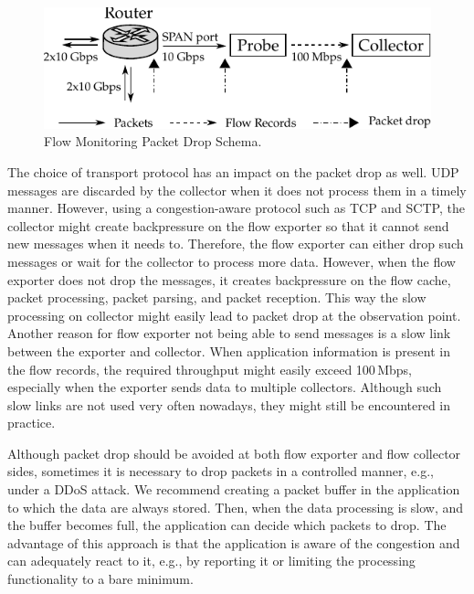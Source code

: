 \begin{figure}[t!]
  \begin{center}
    \includegraphics{figures/c02/flow-packet-drop}
  \end{center}
  \caption{Flow Monitoring Packet Drop Schema.}
  \label{fig:flow-packet-drop}
\end{figure}

The choice of transport protocol has an impact on the packet drop as well. UDP messages are discarded by the collector when it does not process them in a timely manner. However, using a congestion-aware protocol such as TCP and SCTP, the collector might create backpressure on the flow exporter so that it cannot send new messages when it needs to. Therefore, the flow exporter can either drop such messages or wait for the collector to process more data. However, when the flow exporter does not drop the messages, it creates backpressure on the flow cache, packet processing, packet parsing, and packet reception. This way the slow processing on collector might easily lead to packet drop at the observation point. Another reason for flow exporter not being able to send messages is a slow link between the exporter and collector. When application information is present in the flow records, the required throughput might easily exceed 100\,Mbps, especially when the exporter sends data to multiple collectors. Although such slow links are not used very often nowadays, they might still be encountered in practice.

Although packet drop should be avoided at both flow exporter and flow collector sides, sometimes it is necessary to drop packets in a controlled manner, e.g., under a DDoS attack. We recommend creating a packet buffer in the application to which the data are always stored. Then, when the data processing is slow, and the buffer becomes full, the application can decide which packets to drop. The advantage of this approach is that the application is aware of the congestion and can adequately react to it, e.g., by reporting it or limiting the processing functionality to a bare minimum.

